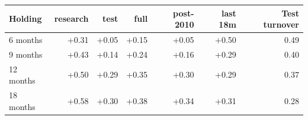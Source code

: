 \begin{tabular}{lrrrrrr}
\toprule
Holding & research & test & full & post-2010 & last 18m & Test turnover \\
\midrule
6 months & +0.31 & +0.05 & +0.15 & +0.05 & +0.50 & 0.49 \\
9 months & +0.43 & +0.14 & +0.24 & +0.16 & +0.29 & 0.40 \\
12 months & +0.50 & +0.29 & +0.35 & +0.30 & +0.29 & 0.37 \\
18 months & +0.58 & +0.30 & +0.38 & +0.34 & +0.31 & 0.28 \\
\bottomrule
\end{tabular}
